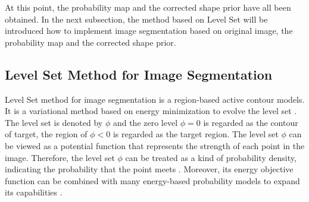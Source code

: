 At this point, the probability map and the corrected shape prior have all been obtained. In the next subsection, the method based on Level Set will be introduced how to implement image segmentation based on original image, the probability map and the corrected shape prior.

\subsection{Level Set Method for Image Segmentation}\label{subsec: Level Set Method for Image Segmentation}
Level Set method for image segmentation is a region-based active contour models. It is a variational method based on energy minimization to evolve the level set \cite{LevelSet:malladi1995shape}. The level set is denoted by $\phi$ and the zero level $\phi=0$ is regarded as the contour of target, the region of $\phi<0$ is regarded as the target region. The level set $\phi$ can be viewed as a potential function that represents the strength of each point in the image. Therefore, the level set $\phi$ can be treated as a kind of probability density, indicating the probability that the point meets \cite{LevelSet:prob:cremers2008shape}. Moreover, its energy objective function can be combined with many energy-based probability models to expand its capabilities \cite{LevelSet:prob:chen2013deep}.

